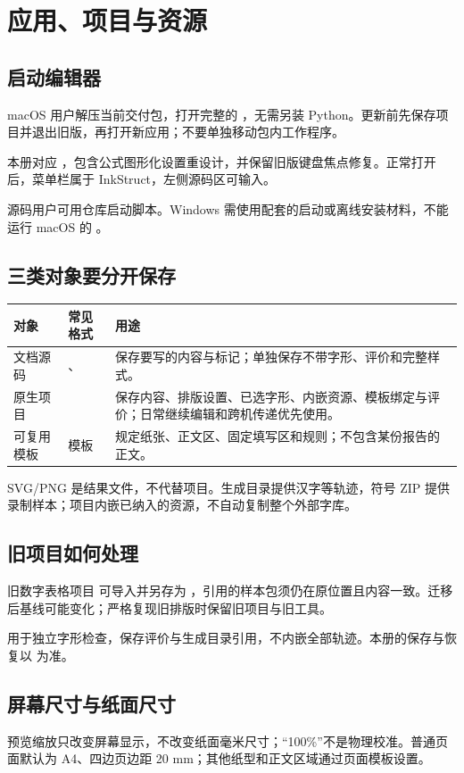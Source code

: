 \chapter{应用、项目与资源}\label{ch:basics}
\section{启动编辑器}
macOS 用户解压当前交付包，打开完整的 ，无需另装 Python。更新前先保存项目并退出旧版，再打开新应用；不要单独移动包内工作程序。

本册对应 ，包含公式图形化设置重设计，并保留旧版键盘焦点修复。正常打开后，菜单栏属于 InkStruct，左侧源码区可输入。

源码用户可用仓库启动脚本。Windows 需使用配套的启动或离线安装材料，不能运行 macOS 的 。

\section{三类对象要分开保存}
\par\noindent\begin{tabularx}{\linewidth}{@{}P{28mm}P{34mm}Y@{}}
\toprule
对象 & 常见格式 & 用途\\\midrule
文档源码 & 、 & 保存要写的内容与标记；单独保存不带字形、评价和完整样式。\\
原生项目 &  & 保存内容、排版设置、已选字形、内嵌资源、模板绑定与评价；日常继续编辑和跨机传递优先使用。\\
可复用模板 & 模板  & 规定纸张、正文区、固定填写区和规则；不包含某份报告的正文。\\
\bottomrule
\end{tabularx}

SVG/PNG 是结果文件，不代替项目。生成目录提供汉字等轨迹，符号 ZIP 提供录制样本；项目内嵌已纳入的资源，不自动复制整个外部字库。

\section{旧项目如何处理}
旧数字表格项目  可导入并另存为 ，引用的样本包须仍在原位置且内容一致。迁移后基线可能变化；严格复现旧排版时保留旧项目与旧工具。

 用于独立字形检查，保存评价与生成目录引用，不内嵌全部轨迹。本册的保存与恢复以  为准。

\section{屏幕尺寸与纸面尺寸}
预览缩放只改变屏幕显示，不改变纸面毫米尺寸；“100\%”不是物理校准。普通页面默认为 A4、四边页边距 20 mm；其他纸型和正文区域通过页面模板设置。
